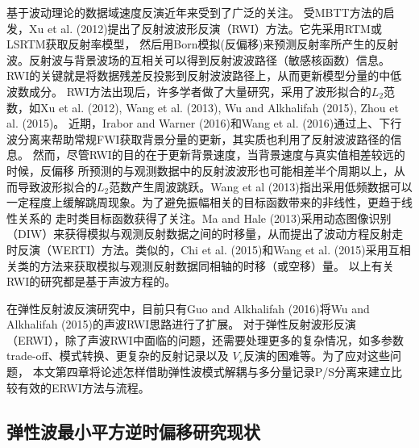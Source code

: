 基于波动理论的数据域速度反演近年来受到了广泛的关注。
受MBTT方法的启发，Xu et al. (2012)\cite{xu:2012}提出了反射波波形反演（RWI）方法。它先采用RTM或LSRTM获取反射率模型，
然后用Born模拟(反偏移)来预测反射率所产生的反射波。反射波与背景波场的互相关可以得到反射波波路径（敏感核函数）信息。
RWI的关键就是将数据残差反投影到反射波波路径上，从而更新模型分量的中低波数成分。
RWI方法出现后，许多学者做了大量研究，采用了波形拟合的$L_2$范数，如Xu
et al. (2012)\cite{xu:2012}, Wang et al. (2013)\cite{Wang2013}, Wu and
Alkhalifah (2015)\cite{Wu2015b},
Zhou et
al. (2015)\cite{zhou:2015}。
近期，Irabor and
Warner (2016)\cite{Irabor2016}和Wang et al.
(2016)\cite{WangFangEtAl2016}通过上、下行波分离来帮助常规FWI获取背景分量的更新，其实质也利用了反射波波路径的信息。
然而，尽管RWI的目的在于更新背景速度，当背景速度与真实值相差较远的时候，反偏移
所预测的与观测数据中的反射波波形也可能相差半个周期以上，从而导致波形拟合的$L_2$范数产生周波跳跃。Wang et
al
(2013)\cite{Wang2013}指出采用低频数据可以一定程度上缓解跳周现象。为了避免振幅相关的目标函数带来的非线性，更趋于线性关系的
走时类目标函数获得了关注。Ma and
Hale
(2013)\cite{ma2013}采用动态图像识别（DIW）来获得模拟与观测反射数据之间的时移量，从而提出了波动方程反射走时反演（WERTI）方法。类似的，Chi
et al. (2015)\cite{chi2015}和Wang et al.
(2015)\cite{Wang2015}采用互相关类的方法来获取模拟与观测反射数据同相轴的时移（或空移）量。
以上有关RWI的研究都是基于声波方程的。

在弹性反射波反演研究中，目前只有Guo and
Alkhalifah (2016)\cite{Guo2016}将Wu and
Alkhalifah (2015)\cite{Wu2015b}的声波RWI思路进行了扩展。
对于弹性反射波形反演（ERWI），除了声波RWI中面临的问题，还需要处理更多的复杂情况，如多参数trade-off、模式转换、更复杂的反射记录以及
$V_s$反演的困难等。为了应对这些问题，
本文第四章将论述怎样借助弹性波模式解耦与多分量记录P/S分离来建立比较有效的ERWI方法与流程。

\subsection{弹性波最小平方逆时偏移研究现状}

